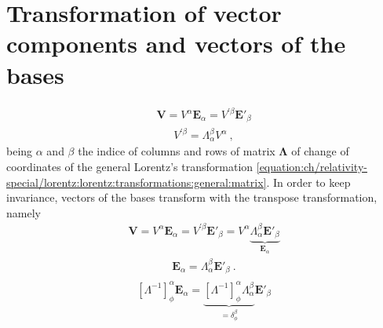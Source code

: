 \documentclass[letterpaper,10pt,english]{jupyterBook}
\begin{document}
\section{Transformation of vector components and vectors of the bases}
\label{\detokenize{ch/relativity-special/lorentz:transformation-of-vector-components-and-vectors-of-the-bases}}\begin{equation*}
\begin{split}\mathbf{V} = V^{\alpha} \mathbf{E}_{\alpha} = V^{'\beta} \mathbf{E}'_{\beta}\end{split}
\end{equation*}\begin{equation*}
\begin{split}V^{'\beta} = \Lambda_{\alpha}^{\beta} V^{\alpha} \ ,\end{split}
\end{equation*}
\sphinxAtStartPar
being \(\alpha\) and \(\beta\) the indice of columns and rows of matrix \(\symbf{\Lambda}\) of change of coordinates of the general Lorentz’s transformation \eqref{equation:ch/relativity-special/lorentz:lorentz:transformations:general:matrix}. In order to keep invariance, vectors of the bases transform with the transpose transformation, namely
\begin{equation*}
\begin{split}\mathbf{V} = V^{\alpha} \mathbf{E}_{\alpha} = V^{'\beta} \mathbf{E}'_{\beta} =  V^{\alpha} \underbrace{\Lambda_{\alpha}^{\beta}  \mathbf{E}'_{\beta}}_{\mathbf{E}_{\alpha}}\end{split}
\end{equation*}\begin{equation}\label{equation:ch/relativity-special/lorentz:vector:transformation:bases}
\begin{split}\mathbf{E}_{\alpha} = \Lambda_{\alpha}^{\beta}  \mathbf{E}'_{\beta} \ .\end{split}
\end{equation}\begin{equation*}
\begin{split}\begin{aligned}
  \left[ \Lambda^{-1} \right]^{\alpha}_{\phi}\mathbf{E}_{\alpha} = \underbrace{[\Lambda^{-1}]^{\alpha}_{\phi} \Lambda_{\alpha}^{\beta}}_{= \delta_{\phi}^{\beta}}  \mathbf{E}'_{\beta} \\
\end{aligned}\end{split}
\end{equation*}
\end{document}
